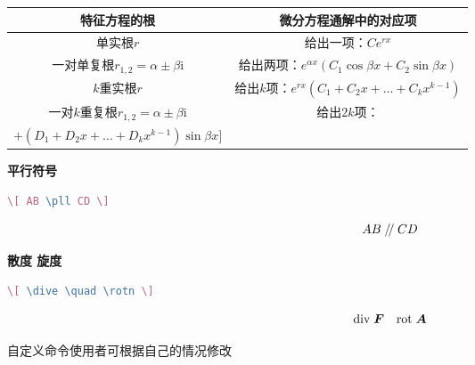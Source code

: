 \documentclass[12pt, a4paper, oneside, UTF8]{ctexbook}
\begin{document}
    \begin{table}[htbp!]
        \centering
        \begin{tabular}{|c|c|}
            \hline
            特征方程的根                                        & 微分方程通解中的对应项                                                                 \\
            \hline
            单实根$r$                                           & 给出一项：$Ce^{rx}$                                                                    \\
            \hline
            一对单复根$r_{1,2} = \alpha \pm \beta\mathrm{i}$    & 给出两项：$e^{\alpha{x}}(C_1\cos\beta{x}+C_2\sin\beta{x})$                             \\
            \hline
            $k$重实根$r$                                        & 给出$k$项：$e^{rx}(C_1+C_2x+\dots+C_kx^{k-1})$                                         \\
            \hline
            一对$k$重复根$r_{1,2} = \alpha \pm \beta\mathrm{i}$ & 给出$2k$项：\tabincell{c}{$e^{\alpha{x}} \big[(C_1+C_2x+\dots+C_kx^{k-1})\cos\beta{x}$ \\ $+ (D_1+D_2x+\dots+D_kx^{k-1})\sin\beta{x} \big]$} \\
            \hline
        \end{tabular}
    \end{table}


    \textbf{平行符号}

    \begin{lstlisting}[language=TeX]
        \[ AB \pll CD \]
    \end{lstlisting}

    \[ AB \kern 0.56em/\kern -0.8em /\kern 0.56em CD \]

    \textbf{散度 旋度}

    \begin{lstlisting}[language=TeX]
        \[ \dive \quad \rotn \]
    \end{lstlisting}

    \[ \mathrm{div}\;\boldsymbol{F} \quad \mathrm{rot}\;\boldsymbol{A} \]

    自定义命令使用者可根据自己的情况修改
    

\ifx\allfiles\undefined
\end{document}
